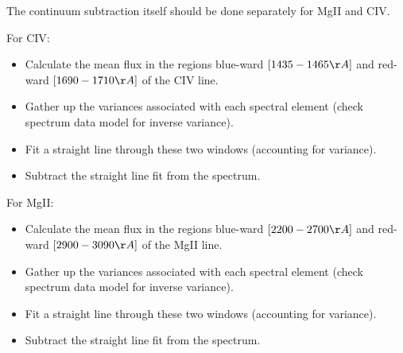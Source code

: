 \documentclass[12pt]{article}
\begin{document}
        The continuum subtraction itself should be done separately for MgII and CIV.

        For CIV:
        \begin{itemize}
            \item Calculate the mean flux in the regions blue-ward $[1435 - 1465 \AA]$ and red-ward $[1690 - 1710 \AA]$ of the CIV line.
            \item Gather up the variances associated with each spectral element (check spectrum data model for inverse variance).
            \item Fit a straight line through these two windows (accounting for variance).
            \item Subtract the straight line fit from the spectrum.
        \end{itemize}

        For MgII:
        \begin{itemize}
            \item Calculate the mean flux in the regions blue-ward $[2200 - 2700 \AA]$ and red-ward $[2900 - 3090 \AA]$ of the MgII line.
            \item Gather up the variances associated with each spectral element (check spectrum data model for inverse variance).
            \item Fit a straight line through these two windows (accounting for variance).
            \item Subtract the straight line fit from the spectrum.
        \end{itemize}
\end{document}
